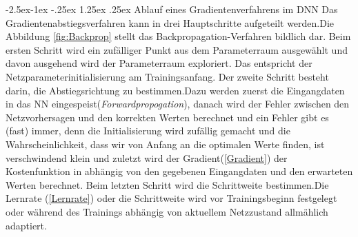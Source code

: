 \documentclass[12pt,a4paper]{scrartcl}
\makeatletter
\numberwithin{equation}{section}
\renewcommand\paragraph{\@startsection{paragraph}{4}{\z@}%
	{-2.5ex\@plus -1ex \@minus -.25ex}%
	{1.25ex \@plus .25ex}%
	{\normalfont\normalsize\bfseries}}
\makeatother
\begin{document}
\paragraph{Ablauf eines Gradientenverfahrens im \ac{DNN} }
Das Gradientenabstiegsverfahren kann in drei Hauptschritte aufgeteilt werden.Die Abbildung \ref{fig:Backprop} stellt das Backpropagation-Verfahren bildlich dar.
Beim ersten Schritt  wird ein zufälliger Punkt aus dem Parameterraum ausgewählt und davon ausgehend wird der Parameterraum exploriert. Das entspricht der Netzparameterinitialisierung am Trainingsanfang.
Der zweite Schritt besteht darin, die Abstiegsrichtung zu bestimmen.Dazu werden zuerst die Eingangdaten in das \ac{NN} eingespeist(\textit{Forwardpropogation}), danach wird der Fehler zwischen den Netzvorhersagen und den korrekten Werten berechnet und ein Fehler gibt es (fast) immer, denn die Initialisierung wird zufällig gemacht und die Wahrscheinlichkeit, dass wir von Anfang an die optimalen Werte finden, ist verschwindend klein und zuletzt wird der Gradient(\ref{Gradient}) der Kostenfunktion in abhängig von den gegebenen Eingangdaten und den erwarteten Werten berechnet. 
 Beim letzten Schritt wird die Schrittweite bestimmen.Die Lernrate (\ref{Lernrate}) oder die Schrittweite wird vor Trainingsbeginn festgelegt oder während des Trainings abhängig von aktuellem Netzzustand allmählich adaptiert.
\end{document}
